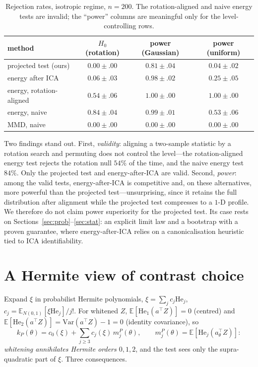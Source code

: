 \documentclass[]{interact}
\theoremstyle{plain}
\theoremstyle{remark}
\newcommand{\E}{\mathbb{E}}
\newcommand{\He}{\mathrm{He}}
\begin{document}
\begin{table}[t]
\centering
\begin{tabular}{lccc}
\toprule
method & $H_0$ (rotation) & power (Gaussian) & power (uniform)\\
\midrule
projected test (ours)     & $0.00\pm.00$ & $0.81\pm.04$ & $0.04\pm.02$\\
energy after ICA          & $0.06\pm.03$ & $0.98\pm.02$ & $0.25\pm.05$\\
energy, rotation-aligned  & $0.54\pm.06$ & $1.00\pm.00$ & $1.00\pm.00$\\
energy, naive             & $0.84\pm.04$ & $0.99\pm.01$ & $0.53\pm.06$\\
MMD, naive                & $0.00\pm.00$ & $0.00\pm.00$ & $0.00\pm.00$\\
\bottomrule
\end{tabular}
\caption{Rejection rates, isotropic regime, $n=200$. The rotation-aligned and naive
energy tests are invalid; the ``power'' columns are meaningful only for the
level-controlling rows.}
\label{tab:power}
\end{table}

Two findings stand out. First, \emph{validity}: aligning a two-sample statistic by
a rotation search and permuting does not control the level---the rotation-aligned
energy test rejects the rotation null $54\%$ of the time, and the naive energy test
$84\%$. Only the projected test and energy-after-ICA are valid. Second,
\emph{power}: among the valid tests, energy-after-ICA is competitive and, on these
alternatives, more powerful than the projected test---unsurprising, since it retains
the full distribution after alignment while the projected test compresses to a
$1$-D profile. We therefore do not claim power superiority for the projected test.
Its case rests on Sections~\ref{sec:prob}--\ref{sec:stat}: an explicit limit law
and a bootstrap with a proven guarantee, where energy-after-ICA relies on a
canonicalisation heuristic tied to ICA identifiability.

\section{A Hermite view of contrast choice}
\label{sec:xi}

Expand $\xi$ in probabilist Hermite polynomials, $\xi=\sum_j c_j\He_j$,
$c_j=\E_{N(0,1)}[\xi\He_j]/j!$. For whitened $Z$, $\E[\He_1(a^\top Z)]=0$ (centred)
and $\E[\He_2(a^\top Z)]=\mathrm{Var}(a^\top Z)-1=0$ (identity covariance), so
\begin{equation}
\label{eq:hermite}
k_P(\theta)=c_0(\xi)+\sum_{j\ge3}c_j(\xi)\,m_j^P(\theta),\qquad
m_j^P(\theta)=\E[\He_j(a_\theta^\top Z)] :
\end{equation}
\emph{whitening annihilates Hermite orders $0,1,2$}, and the test sees only the
supra-quadratic part of $\xi$. Three consequences.
\end{document}
